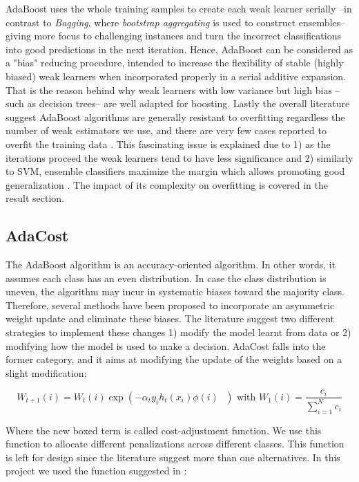 \documentclass[conference]{IEEEtran}
\begin{document}
AdaBoost uses the whole training samples to create each weak learner serially --in contrast to \textit{Bagging}, where \textit{bootstrap aggregating} is used to construct ensembles-- giving more focus to challenging instances and turn the incorrect classifications into good predictions in the next iteration. Hence, AdaBoost can be considered as a "bias" reducing procedure, intended to increase the flexibility of stable (highly biased) weak learners when incorporated properly in a serial additive expansion. That is the reason behind why weak learners with low variance but high bias --such as decision trees-- are well adapted for boosting. Lastly the overall literature suggest AdaBoost algorithms are generally resistant to overfitting regardless the number of weak estimators we use, and there are very few cases reported to overfit the training data \cite{BoostingStats}. This fascinating issue is explained due to 1) as the iterations proceed the weak learners tend to have less significance and 2) similarly to SVM, ensemble classifiers maximize the margin which allows promoting good generalization \cite{margin_adaboost}. The impact of its complexity on overfitting is covered in the result section.

\subsection{AdaCost}
The AdaBoost algorithm is an accuracy-oriented algorithm. In other words, it assumes each class has an even distribution. In case the class distribution is uneven, the algorithm may incur in systematic biases toward the majority class. Therefore, several methods have been proposed to incorporate an asymmetric weight update and eliminate these biases. The literature suggest two different strategies to implement these changes \cite{need_boosting} 1) modify the model learnt from data or 2) modifying how the model is used to make a decision. AdaCost falls into the former category, and it aims at modifying the update of the weights based on a slight modification:

$$ W_{t+1}(i) = W_t(i) \exp \left(-\alpha_t y_i h_t(x_i) \boxed{\phi(i)} \text{ } \right) \text{  with  } W_1(i) = \frac{c_i}{\sum_{i=1}^Nc_i}$$

Where the new boxed term is called cost-adjustment function. We use this function to allocate different penalizations across different classes. This function is left for design since the literature suggest more than one alternatives. In this project we used the function suggested in \cite{ensembles_review}: 
\end{document}
